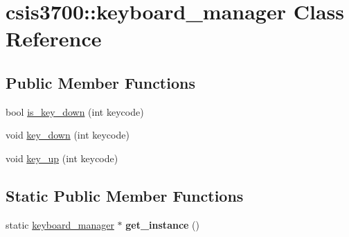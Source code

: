 \hypertarget{classcsis3700_1_1keyboard__manager}{\section{csis3700\-:\-:keyboard\-\_\-manager Class Reference}
\label{classcsis3700_1_1keyboard__manager}
}
\subsection*{Public Member Functions}
\begin{DoxyCompactItemize}
\item 
bool \hyperlink{classcsis3700_1_1keyboard__manager_a6171a0c3677e5e08ddff2bf48b65755d}{is\-\_\-key\-\_\-down} (int keycode)
\item 
void \hyperlink{classcsis3700_1_1keyboard__manager_aae677b5185c2d235b589767c4e3e6098}{key\-\_\-down} (int keycode)
\item 
void \hyperlink{classcsis3700_1_1keyboard__manager_a970b26d49eb327f582ac28ac6caa0f36}{key\-\_\-up} (int keycode)
\end{DoxyCompactItemize}
\subsection*{Static Public Member Functions}
\begin{DoxyCompactItemize}
\item 
\hypertarget{classcsis3700_1_1keyboard__manager_afcaf721946fca027c9525e539691d58a}{static \hyperlink{classcsis3700_1_1keyboard__manager}{keyboard\-\_\-manager} $\ast$ {\bfseries get\-\_\-instance} ()}\label{classcsis3700_1_1keyboard__manager_afcaf721946fca027c9525e539691d58a}

\end{DoxyCompactItemize}


